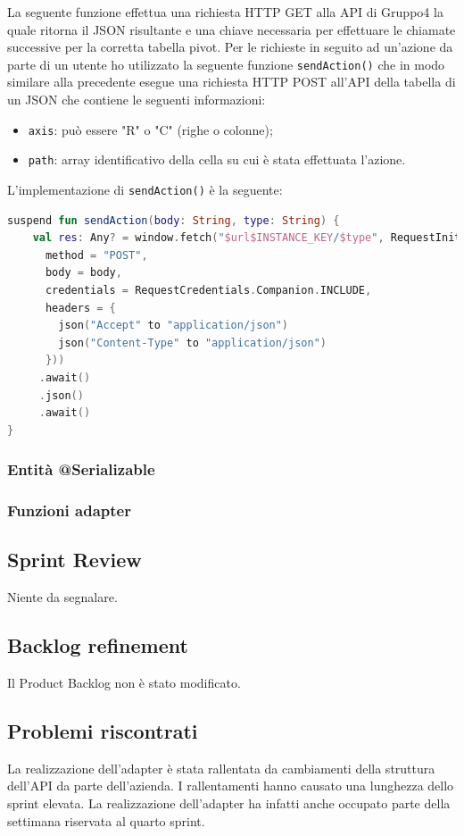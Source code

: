 \noindent
La seguente funzione effettua una richiesta HTTP GET alla API di Gruppo4 la quale ritorna il JSON risultante e una chiave necessaria per effettuare le chiamate successive per la corretta tabella pivot. Per le richieste in seguito ad un'azione da parte di un utente ho utilizzato la seguente funzione \verb|sendAction()| che in modo similare alla precedente esegue una richiesta HTTP POST all'API della tabella di un JSON che contiene le seguenti informazioni:
\begin{itemize}
	\item \verb|axis|: può essere "R" o "C" (righe o colonne);
	\item \verb|path|: array identificativo della cella su cui è stata effettuata l'azione.
\end{itemize}
L'implementazione di \verb|sendAction()| è la seguente: 
\begin{lstlisting}[caption={Funzione sendAction()}, label={lst:bodycells}, language=Kotlin]
suspend fun sendAction(body: String, type: String) {
    val res: Any? = window.fetch("$url$INSTANCE_KEY/$type", RequestInit(
      method = "POST",
      body = body,
      credentials = RequestCredentials.Companion.INCLUDE,
      headers = {
        json("Accept" to "application/json")
        json("Content-Type" to "application/json")
      }))
     .await()
     .json()
     .await()
}
\end{lstlisting}

\subsubsection{Entità @Serializable}
\subsubsection{Funzioni adapter}

\subsection{Sprint Review}
Niente da segnalare.

\subsection{Backlog refinement}
Il Product Backlog non è stato modificato.

\subsection{Problemi riscontrati}
La realizzazione dell'adapter è stata rallentata da cambiamenti della struttura dell'API da parte dell'azienda. I rallentamenti hanno causato una lunghezza dello sprint elevata. La realizzazione dell'adapter ha infatti anche occupato parte della settimana riservata al quarto sprint.

